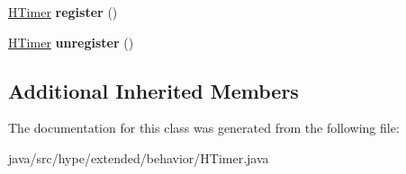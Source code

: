 \begin{DoxyCompactItemize}
\item 
\hypertarget{classhype_1_1extended_1_1behavior_1_1_h_timer_aa4fa705ec4de9c77a5de247984cc0cf0}{\hyperlink{classhype_1_1extended_1_1behavior_1_1_h_timer}{H\-Timer} {\bfseries register} ()}\label{classhype_1_1extended_1_1behavior_1_1_h_timer_aa4fa705ec4de9c77a5de247984cc0cf0}

\item 
\hypertarget{classhype_1_1extended_1_1behavior_1_1_h_timer_ae21ab4aa89b3c9f3444b5f71f22d50d4}{\hyperlink{classhype_1_1extended_1_1behavior_1_1_h_timer}{H\-Timer} {\bfseries unregister} ()}\label{classhype_1_1extended_1_1behavior_1_1_h_timer_ae21ab4aa89b3c9f3444b5f71f22d50d4}

\end{DoxyCompactItemize}
\subsection*{Additional Inherited Members}


The documentation for this class was generated from the following file\-:\begin{DoxyCompactItemize}
\item 
java/src/hype/extended/behavior/H\-Timer.\-java\end{DoxyCompactItemize}
